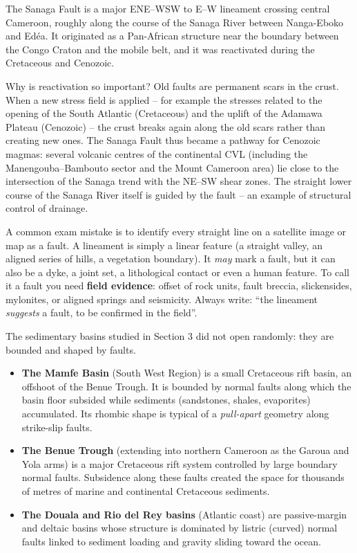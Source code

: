 \documentclass[11pt]{article}
\newcommand{\cle}[1]{{\popxbold\color{popdark}#1}}
\newcounter{popsec}
\newcounter{popsub}
\newcommand{\courssub}[1]{%
  \stepcounter{popsub}%
  \par\vspace{9pt}\noindent{\popxbold\fontsize{11.5}{13}\selectfont\color{popink}{\color{poporange}\thepopsec.\thepopsub}\hspace{6pt}#1}\par\nopagebreak\vspace{4pt}
}
\begin{document}
The \cle{Sanaga Fault} is a major ENE--WSW to E--W lineament crossing central Cameroon, roughly along the course of the Sanaga River between Nanga-Eboko and Ed\'ea. It originated as a Pan-African structure near the boundary between the Congo Craton and the mobile belt, and it was \cle{reactivated} during the Cretaceous and Cenozoic.

Why is reactivation so important? Old faults are permanent scars in the crust. When a new stress field is applied -- for example the stresses related to the opening of the South Atlantic (Cretaceous) and the uplift of the Adamawa Plateau (Cenozoic) -- the crust breaks again along the old scars rather than creating new ones. The Sanaga Fault thus became a pathway for Cenozoic magmas: several volcanic centres of the continental CVL (including the Manengouba--Bambouto sector and the Mount Cameroon area) lie close to the intersection of the Sanaga trend with the NE--SW shear zones. The straight lower course of the Sanaga River itself is guided by the fault -- an example of \cle{structural control of drainage}.

\begin{attention}
A common exam mistake is to identify every straight line on a satellite image or map as a fault. A \cle{lineament} is simply a linear feature (a straight valley, an aligned series of hills, a vegetation boundary). It \emph{may} mark a fault, but it can also be a dyke, a joint set, a lithological contact or even a human feature. To call it a fault you need \textbf{field evidence}: offset of rock units, fault breccia, slickensides, mylonites, or aligned springs and seismicity. Always write: ``the lineament \emph{suggests} a fault, to be confirmed in the field''.
\end{attention}

\courssub{Faults Controlling the Sedimentary Basins}

The sedimentary basins studied in Section 3 did not open randomly: they are bounded and shaped by faults.

\begin{itemize}
\item \textbf{The Mamfe Basin} (South West Region) is a small Cretaceous rift basin, an offshoot of the Benue Trough. It is bounded by \cle{normal faults} along which the basin floor subsided while sediments (sandstones, shales, evaporites) accumulated. Its rhombic shape is typical of a \emph{pull-apart} geometry along strike-slip faults.
\item \textbf{The Benue Trough} (extending into northern Cameroon as the Garoua and Yola arms) is a major Cretaceous rift system controlled by large boundary normal faults. Subsidence along these faults created the space for thousands of metres of marine and continental Cretaceous sediments.
\item \textbf{The Douala and Rio del Rey basins} (Atlantic coast) are passive-margin and deltaic basins whose structure is dominated by listric (curved) normal faults linked to sediment loading and gravity sliding toward the ocean.
\end{itemize}
\end{document}
